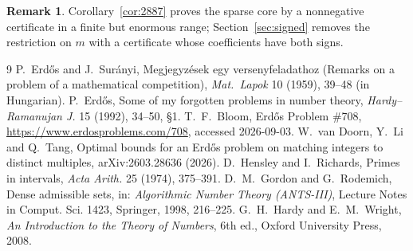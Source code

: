 \documentclass[11pt]{article}
\theoremstyle{definition}
\newtheorem{remark}[theorem]{Remark}
\begin{document}
\begin{remark}
Corollary~\ref{cor:2887} proves the sparse core by a nonnegative certificate in a finite but enormous range; Section~\ref{sec:signed}
removes the restriction on $m$ with a certificate whose coefficients have both signs.
\end{remark}













\begin{thebibliography}{9}
 P.~Erd\H{o}s and J.~Sur\'anyi, Megjegyz\'esek egy versenyfeladathoz (Remarks on a problem of a
mathematical competition), \emph{Mat.\ Lapok} 10 (1959), 39--48 (in Hungarian).
 P.~Erd\H{o}s, Some of my forgotten problems in number theory, \emph{Hardy--Ramanujan J.} 15
(1992), 34--50, \S1.
 T.~F.~Bloom, Erd\H{o}s Problem \#708, \url{https://www.erdosproblems.com/708}, accessed 2026-09-03.
 W.~van Doorn, Y.~Li and Q.~Tang, Optimal bounds for an Erd\H{o}s problem on matching integers
to distinct multiples, arXiv:2603.28636 (2026).
 D.~Hensley and I.~Richards, Primes in intervals, \emph{Acta Arith.} 25 (1974), 375--391.
 D.~M.~Gordon and G.~Rodemich, Dense admissible sets, in: \emph{Algorithmic Number Theory (ANTS-III)}, Lecture Notes in Comput. Sci. 1423, Springer, 1998, 216--225.
 G.~H.~Hardy and E.~M.~Wright, \emph{An Introduction to the Theory of Numbers}, 6th ed., Oxford University Press, 2008.
\end{thebibliography}
\end{document}
